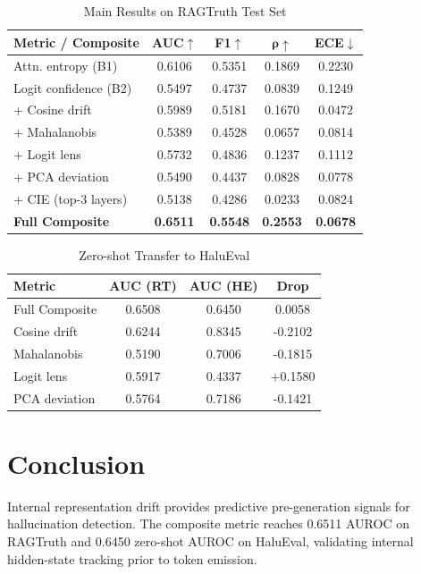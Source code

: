 \documentclass[10pt,twocolumn,a4paper]{article}
\begin{document}
\begin{table}[h]
\centering
\caption{Main Results on RAGTruth Test Set}
\label{tab:main_results}
\begin{tabular}{lcccc}
\toprule
\textbf{Metric / Composite} & \textbf{AUC}$\uparrow$ & \textbf{F1}$\uparrow$ & $\mathbf{\rho}\uparrow$ & \textbf{ECE}$\downarrow$ \\
\midrule
Attn. entropy (B1) & 0.6106 & 0.5351 & 0.1869 & 0.2230 \\
Logit confidence (B2) & 0.5497 & 0.4737 & 0.0839 & 0.1249 \\
\midrule
+ Cosine drift & 0.5989 & 0.5181 & 0.1670 & 0.0472 \\
+ Mahalanobis & 0.5389 & 0.4528 & 0.0657 & 0.0814 \\
+ Logit lens & 0.5732 & 0.4836 & 0.1237 & 0.1112 \\
+ PCA deviation & 0.5490 & 0.4437 & 0.0828 & 0.0778 \\
+ CIE (top-3 layers) & 0.5138 & 0.4286 & 0.0233 & 0.0824 \\
\midrule
\textbf{Full Composite} & \textbf{0.6511} & \textbf{0.5548} & \textbf{0.2553} & \textbf{0.0678} \\
\bottomrule
\end{tabular}
\end{table}

\begin{table}[h]
\centering
\caption{Zero-shot Transfer to HaluEval}
\label{tab:transfer}
\begin{tabular}{lccc}
\toprule
\textbf{Metric} & \textbf{AUC (RT)} & \textbf{AUC (HE)} & \textbf{Drop} \\
\midrule
Full Composite & 0.6508 & 0.6450 & 0.0058 \\
Cosine drift & 0.6244 & 0.8345 & -0.2102 \\
Mahalanobis & 0.5190 & 0.7006 & -0.1815 \\
Logit lens & 0.5917 & 0.4337 & +0.1580 \\
PCA deviation & 0.5764 & 0.7186 & -0.1421 \\
\bottomrule
\end{tabular}
\end{table}

\section{Conclusion}
Internal representation drift provides predictive pre-generation signals for hallucination detection. The composite metric reaches 0.6511 AUROC on RAGTruth and 0.6450 zero-shot AUROC on HaluEval, validating internal hidden-state tracking prior to token emission.
\end{document}
